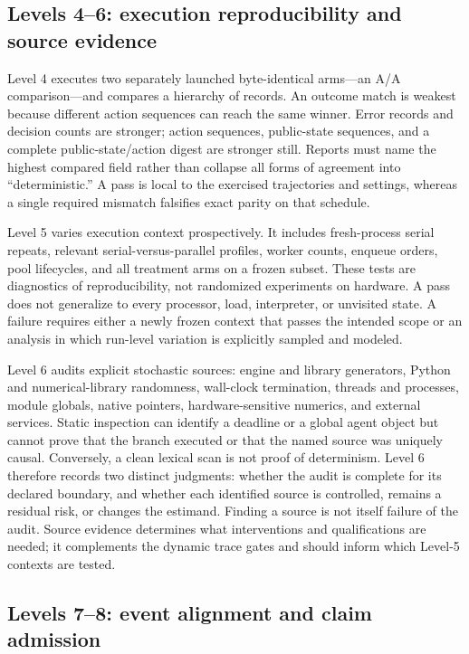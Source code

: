\documentclass[aps,reprint,superscriptaddress,longbibliography,floatfix]{revtex4-2}
\begin{document}
\subsection{Levels 4--6: execution reproducibility and source evidence}

Level 4 executes two separately launched byte-identical arms---an A/A
comparison---and compares a hierarchy of records.  An
outcome match is weakest because different action sequences can reach the same
winner.  Error records and decision counts are stronger; action sequences,
public-state sequences, and a complete public-state/action digest are stronger
still.  Reports must name the highest compared field rather than collapse all
forms of agreement into ``deterministic.''  A pass is local to the exercised
trajectories and settings, whereas a single required mismatch falsifies exact
parity on that schedule.

Level 5 varies execution context prospectively.  It includes fresh-process
serial repeats, relevant serial-versus-parallel profiles, worker counts,
enqueue orders, pool lifecycles, and all treatment arms on a frozen subset.
These tests are diagnostics of reproducibility, not randomized experiments on
hardware.  A pass does not generalize to every processor, load, interpreter, or
unvisited state.  A failure requires either a newly frozen context that passes
the intended scope or an analysis in which run-level variation is explicitly
sampled and modeled.

Level 6 audits explicit stochastic sources: engine and library generators,
Python and numerical-library randomness, wall-clock termination, threads and
processes, module globals, native pointers, hardware-sensitive numerics, and
external services.  Static inspection can identify a deadline or a global
agent object but cannot prove that the branch executed or that the named source
was uniquely causal.  Conversely, a clean lexical scan is not proof of
determinism.  Level 6 therefore records two distinct judgments: whether the
audit is complete for its declared boundary, and whether each identified source
is controlled, remains a residual risk, or changes the estimand.  Finding a
source is not itself failure of the audit.  Source evidence determines what
interventions and qualifications are needed; it complements the dynamic trace
gates and should inform which Level-5 contexts are tested.

\subsection{Levels 7--8: event alignment and claim admission}
\end{document}

